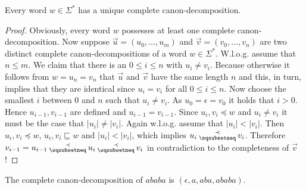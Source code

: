\begin{lemma}
	Every word $w\in\Sigma^\ast$ has a unique complete canon-decomposition.
\end{lemma}
\begin{proof}
	Obviously, every word $w$ possesses at least one complete canon-decomposition. Now suppose $\vec{u} = (u_0,\ldots,u_m)$ and $\vec{v}=(v_0,\ldots,v_n)$ are two distinct complete canon-decompositions of
	a word $w\in\Sigma^\ast$. W.l.o.g. assume that $n \leq m$. We claim that there is an $0\leq i \leq n$ with $u_i \neq v_i$. Because otherwise it follows from $w= u_n = v_n$ that    
	$\vec{u}$ and $\vec{v}$ have the same length $n$ and this, in turn, implies that they are identical since $u_i=v_i$ for all $0\leq i\leq n$. Now choose the smallest $i$ between $0$ and $n$ such that $u_i \neq v_i$. As $u_0 = \epsilon = v_0$ it holds that $i>0$. Hence $u_{i-1}, v_{i-1}$ are defined and $u_{i-1} = v_{i-1}$. Since $u_i, v_i \preceq w$ and $u_i \neq v_i$ it must be the case that $|u_i| \neq |v_i|$. Again w.l.o.g. assume that $|u_i| < |v_i|$. Then  $u_i, v_i \preceq w$, $u_i, v_i \sqsubseteq w$ and $|u_i| < |v_i|$, which implies $u_i \presuf v_i$. Therefore 
	$v_{i-1} = u_{i-1} \presuf u_i \presuf v_i$ in contradiction to the completeness of $\vec{v}$!
\end{proof}

\begin{example}
	The  complete canon-decomposition of $ababa$ is $(\epsilon, a, aba, ababa)$.
\end{example}

%

